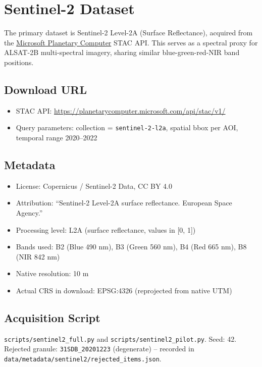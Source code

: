 \section{Sentinel-2 Dataset}

The primary dataset is Sentinel-2 Level-2A (Surface Reflectance), acquired from the \href{https://planetarycomputer.microsoft.com}{Microsoft Planetary Computer} STAC API. This serves as a spectral proxy for ALSAT-2B multi-spectral imagery, sharing similar blue-green-red-NIR band positions.

\subsection*{Download URL}
\begin{itemize}
    \item STAC API: \url{https://planetarycomputer.microsoft.com/api/stac/v1/}
    \item Query parameters: collection = \texttt{sentinel-2-l2a}, spatial bbox per AOI, temporal range 2020--2022
\end{itemize}

\subsection*{Metadata}
\begin{itemize}
    \item License: Copernicus / Sentinel-2 Data, CC BY 4.0
    \item Attribution: ``Sentinel-2 Level-2A surface reflectance. European Space Agency.''
    \item Processing level: L2A (surface reflectance, values in [0, 1])
    \item Bands used: B2 (Blue 490 nm), B3 (Green 560 nm), B4 (Red 665 nm), B8 (NIR 842 nm)
    \item Native resolution: 10 m
    \item Actual CRS in download: EPSG:4326 (reprojected from native UTM)
\end{itemize}

\subsection*{Acquisition Script}
\texttt{scripts/sentinel2\_full.py} and \texttt{scripts/sentinel2\_pilot.py}.
Seed: 42. Rejected granule: \texttt{31SDB\_20201223} (degenerate) -- recorded in \texttt{data/metadata/sentinel2/rejected\_items.json}.

